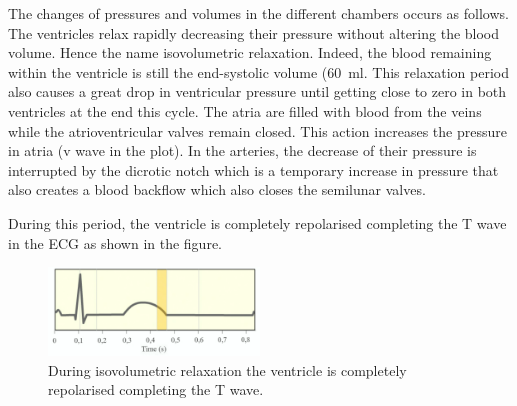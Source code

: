 The changes of pressures and volumes in the different chambers occurs as follows. The ventricles relax rapidly decreasing their pressure without altering the blood volume. Hence the name isovolumetric relaxation. Indeed, the blood remaining within the ventricle is still the end-systolic volume (\SI{60}{\milli\litre}. This relaxation period also causes a great drop in ventricular pressure until getting close to zero in both ventricles at the end this cycle. The atria are filled with blood from the veins while the atrioventricular valves remain closed. This action increases the pressure in atria (v wave in the plot). In the arteries, the decrease of their pressure is interrupted by the dicrotic notch which is a temporary increase in pressure that also creates a blood backflow which also closes the semilunar valves. 

During this period, the ventricle is completely repolarised completing the T wave in the ECG as shown in the figure.

\begin{figure}[!htpb]
	\centering
	\includegraphics[width=0.5\textwidth,keepaspectratio]{figure_11} 
	\caption[Isovolumetric relaxation in ECG]{During isovolumetric relaxation the ventricle is completely repolarised completing the T wave.}
	\label{fig:ECG isovolumetric relaxation}
\end{figure}


